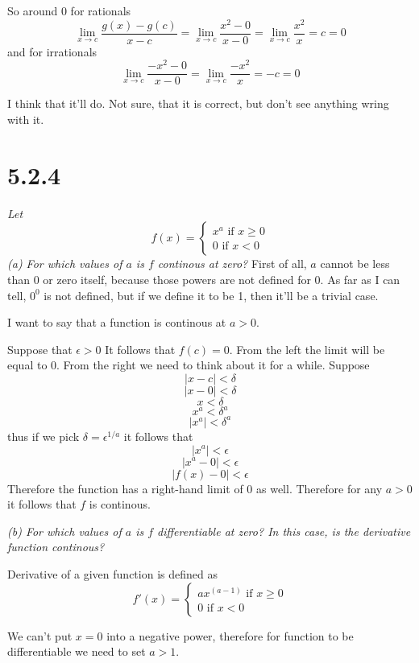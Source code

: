 \documentclass[11pt,oneside,titlepage]{book}
\begin{document}
So around 0 for rationals
$$\lim_{x \to c}\frac{g(x) - g(c)}{x - c} =
\lim_{x \to c}\frac{x^2 - 0}{x - 0} = \lim_{x \to c}\frac{x^2}{x} = c = 0$$
and for irrationals
$$\lim_{x \to c}\frac{-x^2 - 0}{x - 0} = \lim_{x \to c}\frac{-x^2}{x} = -c
= 0$$

I think that it'll do. Not sure, that it is correct, but don't see
anything wring with it.

\section*{5.2.4}
\textit{Let }
\begin{equation}
  f(x) =
  \begin{cases}
    x^a \text{ if } x \geq 0 \\
    0 \text{ if } x < 0
  \end{cases}
\end{equation}
\textit{(a) For which values of $a$ is $f$ continous at zero?}
First of all, $a$ cannot be less than 0 or zero itself, because those powers
are not defined for $0$. As far as I can tell, $0^0$ is not defined, but
if we define it to be 1, then it'll be a trivial case.

I want to say that a function is continous at $a > 0$.

Suppose that $\epsilon > 0$ It follows that $f(c) = 0$. From the
left the limit will be equal to $0$. From the right we need to think about it
for a while. Suppose
$$|x - c| < \delta$$
$$|x - 0| < \delta$$
$$x < \delta$$
$$x^a < \delta^a$$
$$|x^a| < \delta^a$$
thus if we pick $\delta = \epsilon^{1/a}$ it follows that 
$$|x^a| < \epsilon$$
$$|x^a - 0| < \epsilon$$
$$|f(x) - 0| < \epsilon$$
Therefore the function has a right-hand limit of $0$ as well. Therefore for
any $a > 0$ it follows that $f$ is continous.

\textit{(b) For which values of $a$ is $f$ differentiable at zero? In this
  case, is the derivative function continous?}

Derivative of a given function is defined as
\begin{equation}
  f'(x) =
  \begin{cases}
    ax^(a - 1) \text{ if } x \geq 0 \\
    0 \text{ if } x < 0
  \end{cases}
\end{equation}

We can't put  $x = 0$ into a negative power, therefore  for
function to be differentiable we need to set $a > 1$.
\end{document}
